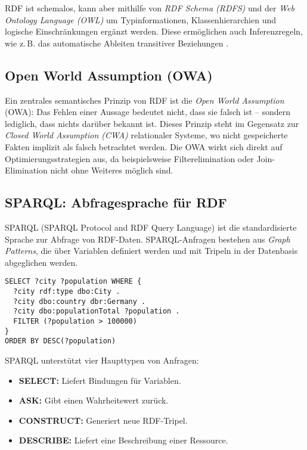 \documentclass[12pt]{article}
\begin{document}
RDF ist schemalos, kann aber mithilfe von \textit{RDF Schema (RDFS)} und der \textit{Web Ontology Language (OWL)} um Typinformationen, Klassenhierarchien und logische Einschränkungen ergänzt werden. Diese ermöglichen auch Inferenzregeln, wie z.\,B. das automatische Ableiten transitiver Beziehungen \cite{antonellini2015owl}.

\subsection{Open World Assumption (OWA)}

Ein zentrales semantisches Prinzip von RDF ist die \textit{Open World Assumption} (OWA): Das Fehlen einer Aussage bedeutet nicht, dass sie falsch ist – sondern lediglich, dass nichts darüber bekannt ist. Dieses Prinzip steht im Gegensatz zur \textit{Closed World Assumption (CWA)} relationaler Systeme, wo nicht gespeicherte Fakten implizit als falsch betrachtet werden. Die OWA wirkt sich direkt auf Optimierungsstrategien aus, da beispielsweise Filterelimination oder Join-Elimination nicht ohne Weiteres möglich sind.

\subsection{SPARQL: Abfragesprache für RDF}

SPARQL (SPARQL Protocol and RDF Query Language) ist die standardisierte Sprache zur Abfrage von RDF-Daten. SPARQL-Anfragen bestehen aus \textit{Graph Patterns}, die über Variablen definiert werden und mit Tripeln in der Datenbasis abgeglichen werden.

\begin{lstlisting}[caption=SPARQL-Abfrage nach Städten mit mehr als 100.000 Einwohnern]
SELECT ?city ?population WHERE {
  ?city rdf:type dbo:City .
  ?city dbo:country dbr:Germany .
  ?city dbo:populationTotal ?population .
  FILTER (?population > 100000)
}
ORDER BY DESC(?population)
\end{lstlisting}

SPARQL unterstützt vier Haupttypen von Anfragen:
\begin{itemize}
    \item \textbf{SELECT:} Liefert Bindungen für Variablen.
    \item \textbf{ASK:} Gibt einen Wahrheitswert zurück.
    \item \textbf{CONSTRUCT:} Generiert neue RDF-Tripel.
    \item \textbf{DESCRIBE:} Liefert eine Beschreibung einer Ressource.
\end{itemize}
\end{document}
